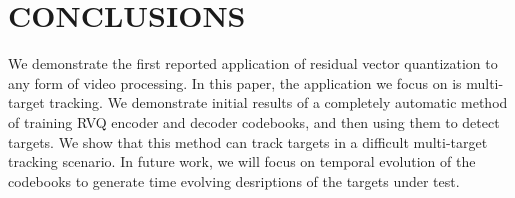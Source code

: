 \documentclass{article}
\begin{document}
\section{CONCLUSIONS}
We demonstrate the first reported application of residual vector quantization to any form of video processing.  In this paper, the application we focus on is multi-target tracking.  We demonstrate initial results of a completely automatic method of training RVQ encoder and decoder codebooks, and then using them to detect targets.  We show that this method can track targets in a difficult multi-target tracking scenario.  In future work, we will focus on temporal evolution of the codebooks to generate time evolving desriptions of the targets under test.



\end{document}
